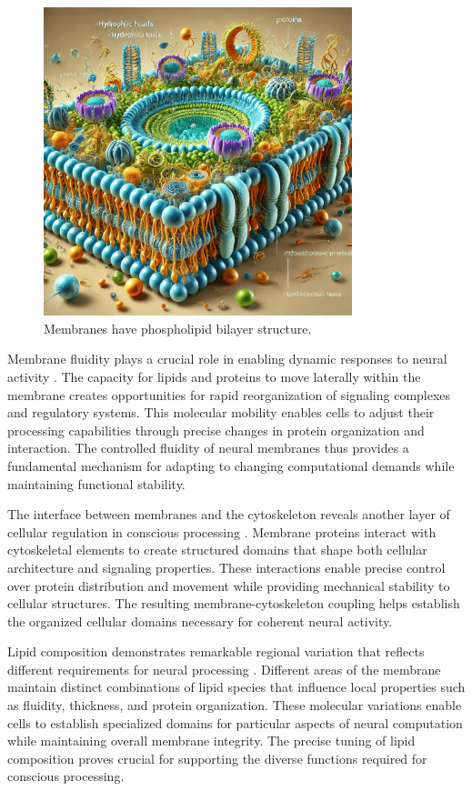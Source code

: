 \begin{refsection}
\begin{figure}[h]
    \centering
    \includegraphics[width=0.8\textwidth]{images/membrane.png}

    \caption{Membranes have phospholipid bilayer structure.}
\end{figure}

Membrane fluidity plays a crucial role in enabling dynamic responses to neural activity \cite{Lingwood2010}. The capacity for lipids and proteins to move laterally within the membrane creates opportunities for rapid reorganization of signaling complexes and regulatory systems. This molecular mobility enables cells to adjust their processing capabilities through precise changes in protein organization and interaction. The controlled fluidity of neural membranes thus provides a fundamental mechanism for adapting to changing computational demands while maintaining functional stability.

The interface between membranes and the cytoskeleton reveals another layer of cellular regulation in conscious processing \cite{Zimmerberg2006}. Membrane proteins interact with cytoskeletal elements to create structured domains that shape both cellular architecture and signaling properties. These interactions enable precise control over protein distribution and movement while providing mechanical stability to cellular structures. The resulting membrane-cytoskeleton coupling helps establish the organized cellular domains necessary for coherent neural activity.

Lipid composition demonstrates remarkable regional variation that reflects different requirements for neural processing \cite{Yang2019}. Different areas of the membrane maintain distinct combinations of lipid species that influence local properties such as fluidity, thickness, and protein organization. These molecular variations enable cells to establish specialized domains for particular aspects of neural computation while maintaining overall membrane integrity. The precise tuning of lipid composition proves crucial for supporting the diverse functions required for conscious processing.


\end{refsection}
